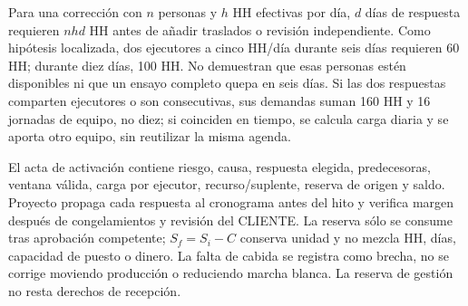 Para una corrección con $n$ personas y $h$ HH efectivas por día, $d$ días de respuesta requieren $n h d$ HH antes de añadir traslados o revisión independiente. Como hipótesis localizada, dos ejecutores a cinco HH/día durante seis días requieren 60 HH; durante diez días, 100 HH. No demuestran que esas personas estén disponibles ni que un ensayo completo quepa en seis días. Si las dos respuestas comparten ejecutores o son consecutivas, sus demandas suman 160 HH y 16 jornadas de equipo, no diez; si coinciden en tiempo, se calcula carga diaria y se aporta otro equipo, sin reutilizar la misma agenda.

El acta de activación contiene riesgo, causa, respuesta elegida, predecesoras, ventana válida, carga por ejecutor, recurso/suplente, reserva de origen y saldo. Proyecto propaga cada respuesta al cronograma antes del hito y verifica margen después de congelamientos y revisión del CLIENTE. La reserva sólo se consume tras aprobación competente; $S_f=S_i-C$ conserva unidad y no mezcla HH, días, capacidad de puesto o dinero. La falta de cabida se registra como brecha, no se corrige moviendo producción o reduciendo marcha blanca. La reserva de gestión no resta derechos de recepción. \parencites[arts.~17, 50.2 y 72; pp.~12--13, 29, 38]{sd8-ba}[RT-19.03/04; p.~33]{sd8-bt}

